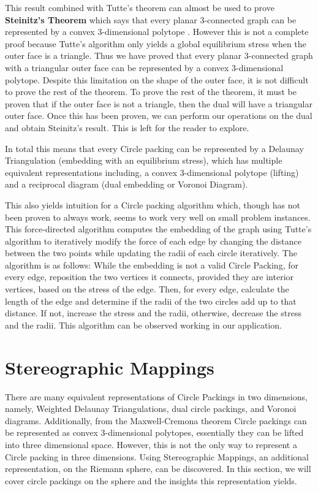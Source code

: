 \documentclass[11pt]{article}
\theoremstyle{definition}
\begin{document}
 This result combined with Tutte's theorem can almost be used to prove \textbf{Steinitz's Theorem} which says that every planar 3-connected graph can be represented by a convex 3-dimensional polytope \cite{realizationSpaces}. However this is not a complete proof because Tutte's algorithm only yields a global equilibrium stress when the outer face is a triangle. Thus we have proved that every planar 3-connected graph with a triangular outer face can be represented by a convex 3-dimensional polytope. Despite this limitation on the shape of the outer face, it is not difficult to prove the rest of the theorem. To prove the rest of the theorem, it must be proven that if the outer face is not a triangle, then the dual will have a triangular outer face. Once this has been proven, we can perform our operations on the dual and obtain Steinitz's result. This is left for the reader to explore.
 
 In total this means that every Circle packing can be represented by a Delaunay Triangulation (embedding with an equilibrium stress), which has multiple equivalent representations including, a convex 3-dimensional polytope (lifting) and a reciprocal diagram (dual embedding or Voronoi Diagram). 

This also yields intuition for a Circle packing algorithm which, though has not been proven to always work, seems to work very well on small problem instances. This force-directed algorithm computes the embedding of the graph using Tutte's algorithm to iteratively modify the force of each edge by changing the distance between the two points while updating the radii of each circle iteratively. The algorithm is as follows: While the embedding is not a valid Circle Packing, for every edge, reposition the two vertices it connects, provided they are interior vertices, based on the stress of the edge. Then, for every edge, calculate the length of the edge and determine if the radii of the two circles add up to that distance. If not, increase the stress and the radii, otherwise, decrease the stress and the radii. This algorithm can be observed working in our application.
 
\section{Stereographic Mappings}
There are many equivalent representations of Circle Packings in two dimensions, namely, Weighted Delaunay Triangulations, dual circle packings, and Voronoi diagrams. Additionally, from the Maxwell-Cremona theorem Circle packings can be represented as convex 3-dimensional polytopes, essentially they can be lifted into three dimensional space. However, this is not the only way to represent a Circle packing in three dimensions. Using Stereographic Mappings, an additional representation, on the Riemann sphere,  can be discovered. In this section, we will cover circle packings on the sphere and the insights this representation yields.
\end{document}

